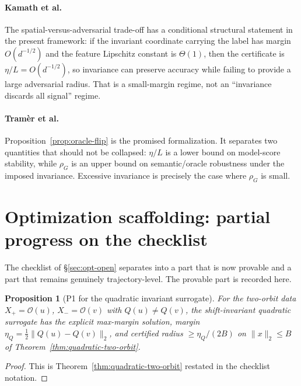 \documentclass[11pt]{article}
\theoremstyle{plain}
\newtheorem{proposition}{Proposition}
\theoremstyle{definition}
\theoremstyle{remark}
\newcommand{\Orb}{\mathcal O}
\begin{document}
\paragraph{Kamath et al.}
The spatial-versus-adversarial trade-off \citep{Kamath2021} has a conditional structural statement in the present framework: if the invariant coordinate carrying the label has margin $O(d^{-1/2})$ and the feature Lipschitz constant is $\Theta(1)$, then the certificate is $\eta/L=O(d^{-1/2})$, so invariance can preserve accuracy while failing to provide a large adversarial radius.  That is a small-margin regime, not an ``invariance discards all signal'' regime.

\paragraph{Tram\`er et al.}
Proposition~\ref{prop:oracle-flip} is the promised formalization.  It separates two quantities that should not be collapsed: $\eta/L$ is a lower bound on model-score stability, while $\rho_G$ is an upper bound on semantic/oracle robustness under the imposed invariance.  Excessive invariance is precisely the case where $\rho_G$ is small.

\section{Optimization scaffolding: partial progress on the checklist}\label{app:opt-scaffold}
The checklist of \S\ref{sec:opt-open} separates into a part that is now provable and a part that remains genuinely trajectory-level.  The provable part is recorded here.

\begin{proposition}[P1 for the quadratic invariant surrogate]\label{prop:p1-quadratic}
For the two-orbit data $X_+=\Orb(u)$, $X_-=\Orb(v)$ with $Q(u)\ne Q(v)$, the shift-invariant quadratic surrogate has the explicit max-margin solution, margin $\eta_Q=\tfrac12\|Q(u)-Q(v)\|_2$, and certified radius $\ge\eta_Q/(2B)$ on $\|x\|_2\le B$ of Theorem~\ref{thm:quadratic-two-orbit}.
\end{proposition}
\begin{proof}
This is Theorem~\ref{thm:quadratic-two-orbit} restated in the checklist notation.
\end{proof}
\end{document}
